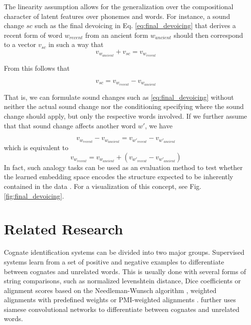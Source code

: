 \documentclass[6pt]{article}
\begin{document}
The linearity assumption allows for the generalization over the compositional character of latent features over phonemes and words. For instance, a sound change $sc$ such as the final devoicing in Eq. \ref{eq:final_devoicing} that derives a recent form of word $w_{recent}$ from an ancient form  $w_{ancient}$ should then correspond to a vector $v_{sc}$ in such a way that 
\begin{equation}
\label{eq:sound_change_linear_dependency}
v_{w_{ancient}}+v_{sc} = v_{w_{recent}}
\end{equation}

From this follows that 

\begin{equation}
v_{sc} =  v_{w_{recent}} - v_{w_{ancient}} 
\end{equation}

That is, we can formulate sound changes such as \ref{eq:final_devoicing} without neither the actual sound change nor the conditioning specifying where the sound change should apply, but only the respective words involved.
If we further assume that that sound change affects another word $w'$, we have

\begin{equation}
v_{w_{recent}} - v_{w_{ancient}}  =  v_{w'_{recent}} - v_{w'_{ancient}} 
\end{equation}
which is equivalent to
\begin{equation}
v_{w_{recent}}  =   v_{w_{ancient}}  + (v_{w'_{recent}} - v_{w'_{ancient}}) 
\end{equation}
In fact, such analogy tasks can be used as an evaluation method to test whether the learned embedding space encodes the structure expected to be inherently contained in the data \citep{mikolov2013distributed}. For a visualization of this concept, see Fig. \ref{fig:final_devoicing}.
 

\section{Related Research}

Cognate identification systems can be divided into two major groups. Supervised systems learn from a set of positive and negative examples to differentiate between cognates and unrelated words. This is usually done with several forms of string comparisons, such as normalized levenshtein distance, Dice coefficients or  alignment scores based on the Needleman-Wunsch algorithm  \citep{bergsma2007alignment,inkpen2005automatic}, weighted alignments with predefined weights \citep{kondrak2000new} or PMI-weighted alignments \citep{jager2014phylogenetic}.  \cite{rama2016siamese} further uses siamese convolutional networks to differentiate between cognates and unrelated words.
\end{document}
